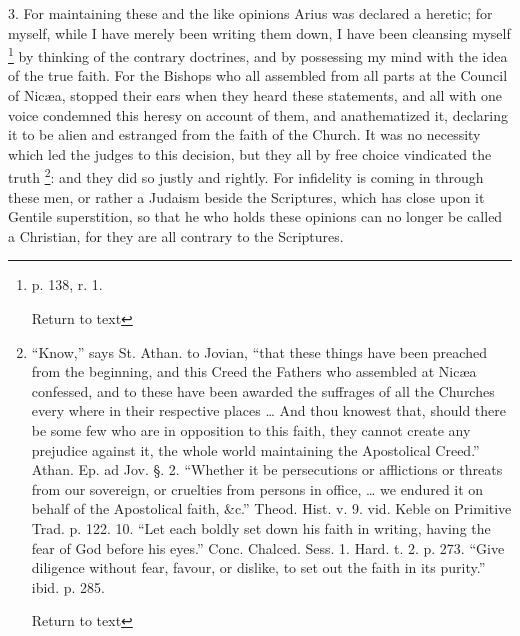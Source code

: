 3. For maintaining these and the like opinions
Arius was declared a heretic; for myself, while I have merely been
writing them down, I have been cleansing myself \footnote{p. 138, r. 1.

Return to text} by thinking of the contrary doctrines, and by possessing my mind
with the idea of the true faith. For the Bishops who all assembled
from all parts at the Council of Nicæa, stopped their ears when they
heard these statements, and all with one voice condemned this heresy
on account of them, and anathematized it, declaring it to be alien and
estranged from the faith of the Church. It was no necessity which led
the judges to this decision, but they all by free choice
vindicated the truth \footnote{``Know,'' says St. Athan. to Jovian, ``that these
things have been preached from the beginning, and this Creed the
Fathers who assembled at Nicæa confessed, and to these have been
awarded the suffrages of all the Churches every where in their
respective places … And thou knowest that, should there be some few
who are in opposition to this faith, they cannot create any prejudice
against it, the whole world maintaining the Apostolical Creed.'' Athan.
Ep. ad Jov. §. 2. ``Whether it be persecutions or afflictions or
threats from our sovereign, or cruelties from persons in office, …
we endured it on behalf of the Apostolical faith, \&c.'' Theod. Hist.
v. 9. vid. Keble on Primitive Trad. p. 122. 10. ``Let each boldly set
down his faith in writing, having the fear of God before his eyes.''
Conc. Chalced. Sess. 1. Hard. t. 2. p. 273. ``Give diligence without
fear, favour, or dislike, to set out the faith in its purity.'' ibid.
p. 285.

Return to text}: and they did so
justly and rightly. For infidelity is coming in through these men, or
rather a Judaism beside the Scriptures, which has close upon it
Gentile superstition, so that he who holds these opinions can no
longer be called a Christian, for they are all contrary to the
Scriptures.

